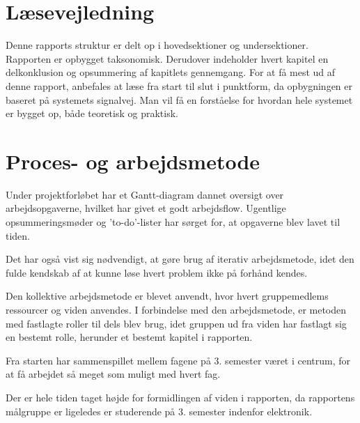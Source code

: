 \section{Læsevejledning}
Denne rapports struktur er delt op i hovedsektioner og undersektioner.
Rapporten er opbygget taksonomisk. 
Derudover indeholder hvert kapitel en delkonklusion og opsummering af kapitlets gennemgang.
For at få mest ud af denne rapport, anbefales at læse fra start til slut i punktform, da opbygningen er baseret på systemets signalvej.
Man vil få en forståelse for hvordan hele systemet er bygget op, både teoretisk og praktisk. 


\section{Proces- og arbejdsmetode}
Under projektforløbet har et Gantt-diagram dannet oversigt over arbejdsopgaverne, hvilket har givet et godt arbejdsflow. Ugentlige opsummeringsmøder og 'to-do'-lister har sørget for, at opgaverne blev lavet til tiden.

Det har også vist sig nødvendigt, at gøre brug af iterativ arbejdsmetode, idet den fulde kendskab af at kunne løse hvert problem ikke på forhånd kendes.

Den kollektive arbejdsmetode er blevet anvendt, hvor hvert gruppemedlems ressourcer og viden anvendes. I forbindelse med den arbejdsmetode, er metoden med fastlagte roller til dels blev brug, idet gruppen ud fra viden har fastlagt sig en bestemt rolle, herunder et bestemt kapitel i rapporten.

Fra starten har sammenspillet mellem fagene på 3. semester været i centrum, for at få arbejdet så meget som muligt med hvert fag. 

Der er hele tiden taget højde for formidlingen af viden i rapporten, da rapportens målgruppe er ligeledes er studerende på 3. semester indenfor elektronik.